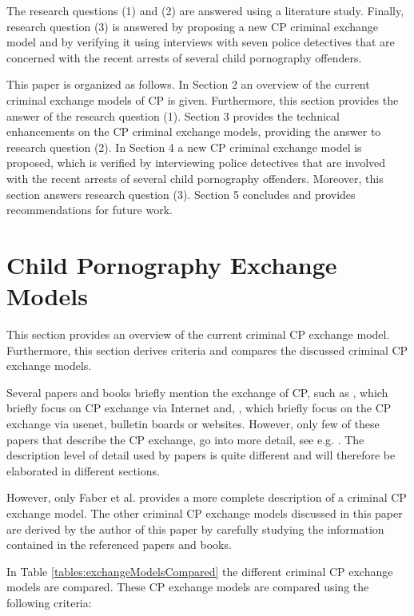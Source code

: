 \documentclass{sig-alternate-br}
\begin{document}
The research questions (1) and (2) are answered using a literature study. Finally, research question (3) is answered by proposing a new CP criminal exchange model and by verifying it using interviews with seven police detectives that are concerned with the recent arrests of several child pornography offenders.

This paper is organized as follows. In Section 2 an overview of the current criminal exchange models of CP is given. Furthermore, this section provides the answer of the research question (1). Section 3 provides the technical enhancements on the CP criminal exchange models, providing the answer to research question (2). In Section 4 a new CP criminal exchange model is proposed, which is verified by interviewing police detectives that are involved with the recent arrests of several child pornography offenders. Moreover, this section answers research question (3). Section 5 concludes and provides recommendations for future work.


\section{Child Pornography Exchange Models}
This section provides an overview of the current criminal CP exchange model. Furthermore, this section derives criteria and compares the discussed criminal CP exchange models.

Several papers and books briefly mention the exchange of CP, such as \cite{wolak2005child, jenkins2001beyond, webb2007characteristics}, which briefly focus on CP exchange via Internet and, \cite{quayle2002paedophiles, beech2008internet}, which briefly focus on the CP exchange via usenet, bulletin boards or websites. However, only few of these papers that describe the CP exchange, 	go into more detail, see e.g. \cite{en2011phishing,wortley2006child,wijk2009achter,callanan2009internet}. The description level of detail used by papers is quite different and will therefore be elaborated in different sections.

However, only Faber et al. \cite{en2011phishing} provides a more complete description of a criminal CP exchange model. The other criminal CP exchange models discussed in this paper are derived by the author of this paper by carefully studying the information contained in the referenced papers and books.

In Table \ref{tables:exchangeModelsCompared} the different criminal CP exchange models are compared. These CP exchange models are compared using the following criteria: 
\end{document}

